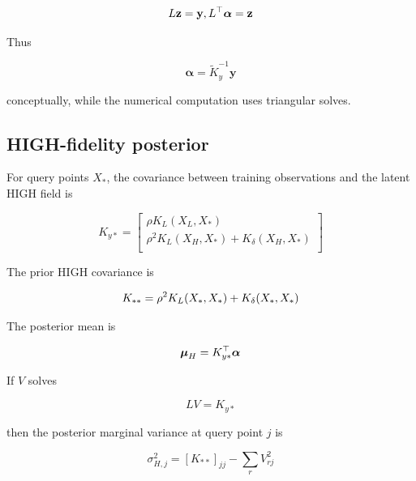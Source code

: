 \documentclass[11pt]{article}
\begin{document}
\begin{equation}
L\mathbf z=\mathbf y, \\
\qquad \\
L^\top\boldsymbol\alpha=\mathbf z
\end{equation}


Thus


\begin{equation}
\boldsymbol\alpha=\widetilde K_y^{-1}\mathbf y
\end{equation}


conceptually, while the numerical computation uses triangular solves.


\subsection{HIGH-fidelity posterior}


For query points $X_*$, the covariance between training observations and the latent HIGH field is


\begin{equation}
K_{y*} = \begin{bmatrix}
\rho K_L(X_L,X_*) \\
\rho^2 K_L(X_H,X_*)+K_\delta(X_H,X_*) \\
\end{bmatrix}
\end{equation}


The prior HIGH covariance is


\begin{equation}
K_{**} \\
= \\
\rho^2K_L(X_*,X_*)+K_\delta(X_*,X_*)
\end{equation}


The posterior mean is


\begin{equation}
\boldsymbol\mu_H \\
= \\
K_{y*}^\top\boldsymbol\alpha
\end{equation}


If $V$ solves


\begin{equation}
LV=K_{y*}
\end{equation}


then the posterior marginal variance at query point $j$ is


\begin{equation}
\sigma_{H,j}^2 =
[K_{**}]_{jj}
-
\sum_r V_{rj}^2
\end{equation}
\end{document}
